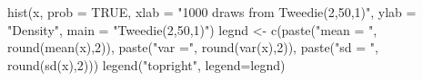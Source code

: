 \begin{Schunk}
\begin{Sinput}
  hist(x, prob = TRUE,  xlab = "1000 draws from Tweedie(2,50,1)", ylab = "Density", main = "Tweedie(2,50,1)")
  legnd <- c(paste("mean = ", round(mean(x),2)), paste("var =", round(var(x),2)), paste("sd = ", round(sd(x),2)))
  legend("topright", legend=legnd)
\end{Sinput}
\end{Schunk}
